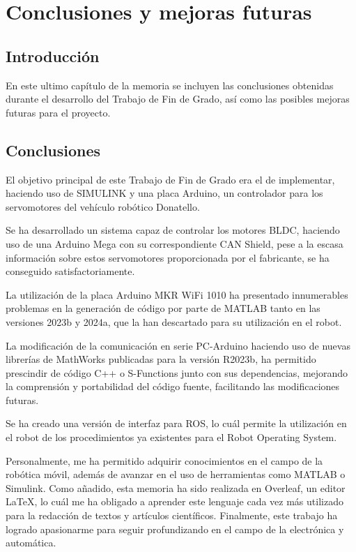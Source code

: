 \chapter{Conclusiones y mejoras futuras}

\thispagestyle{plain}
\renewcommand{\tablename}{Tabla}

\section{Introducción}

En este ultimo capítulo de la memoria se incluyen las conclusiones obtenidas durante el desarrollo del Trabajo de Fin de Grado, así como las posibles mejoras futuras para el proyecto.

\section{Conclusiones}
El objetivo principal de este Trabajo de Fin de Grado era el de implementar, haciendo uso de SIMULINK y una placa Arduino, un controlador para los servomotores del vehículo robótico Donatello.

Se ha desarrollado un sistema capaz de controlar los motores BLDC, haciendo uso de una Arduino Mega con su correspondiente CAN Shield, pese a la escasa información sobre estos servomotores proporcionada por el fabricante, se ha conseguido satisfactoriamente. 

La utilización de la placa Arduino MKR WiFi 1010 ha presentado innumerables problemas en la generación de código por parte de MATLAB tanto en las versiones 2023b y 2024a, que la han descartado para su utilización en el robot.

La modificación de la comunicación en serie PC-Arduino haciendo uso de nuevas librerías de MathWorks publicadas para la versión R2023b, ha permitido prescindir de código C++ o S-Functions junto con sus dependencias, mejorando la comprensión y portabilidad del código fuente, facilitando las modificaciones futuras.

Se ha creado una versión de interfaz para ROS, lo cuál permite la utilización en el robot de los procedimientos ya existentes para el Robot Operating System.

Personalmente, me ha permitido adquirir conocimientos en el campo de la robótica móvil, además de avanzar en el uso de herramientas como MATLAB o Simulink. Como añadido, esta memoria ha sido realizada en Overleaf, un editor LaTeX, lo cuál me ha obligado a aprender este lenguaje cada vez más utilizado para la redacción de textos y artículos científicos. Finalmente, este trabajo ha logrado apasionarme para seguir profundizando en el campo de la electrónica y automática.

